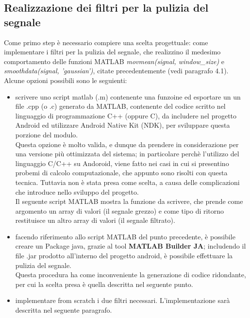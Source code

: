 \documentclass[a4paper, oneside]{book}
\begin{document}
\subsection{Realizzazione dei filtri per la pulizia del segnale}
Come primo step è necessario compiere una scelta progettuale: come implementare i filtri per la pulizia del segnale, che realizzino il medesimo comportamento delle funzioni MATLAB \textit{movmean(signal, window\_size)} e \textit{smoothdata(signal, 'gaussian')}, citate precedentemente (vedi paragrafo 4.1).\\
Alcune opzioni possibili sono le seguienti: 
\begin{itemize}
\item {scrivere uno script matlab (.m) contenente una funzoine ed esportare un un file .cpp (o .c) generato da MATLAB, contenente del codice scritto nel linguaggio di programmazione C++ (oppure C), da includere nel progetto Android ed utilizzare Android Native Kit (NDK), per sviluppare questa porzione del modulo. \\
Questa opzione è molto valida, e dunque da prendere in considerazione per una versione più ottimizzata del sistema; in particolare perchè l'utilizzo del linguaggio C/C++ su Andoroid, viene fatto nei casi in cui si presentino probemi di calcolo computazionale, che appunto sono risolti con questa tecnica. 
Tuttavia non è stata presa come scelta, a causa delle complicazioni che introduce nello sviluppo del progetto.\\
Il seguente script MATLAB mostra la funzione da scrivere, che prende come argomento un array di valori (il segnale grezzo) e come tipo di ritorno restituisce un altro array di valori (il segnale filtrato).\\
}
\item{facendo riferimento allo script MATLAB del punto precedente, è possibile creare un Package java, grazie al tool \textbf{MATLAB Builder JA}; includendo il file .jar prodotto all'interno del progetto android, è possibile effettuare la pulizia del segnale. \\
Questa procedura ha come inconveniente la generazione di codice ridondante, per cui la scelta presa è quella descritta nel seguente punto.}
\item{implementare from scratch i due filtri necessari. L'implementazione sarà descritta nel seguente paragrafo.}
\end{itemize}
\end{document}
